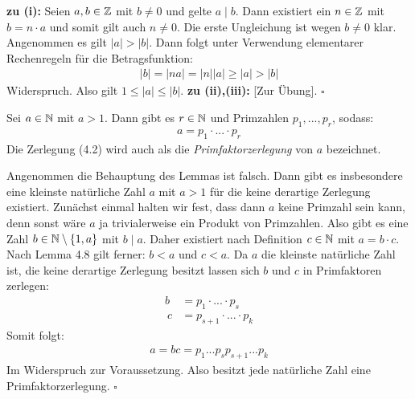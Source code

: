\begin{proof*}
    \textbf{zu (i):} \newline
    Seien $a,b \in \mathbb{Z}$ mit $b \neq 0$ und gelte $a \mid b$. Dann existiert ein $n \in \mathbb{Z}$ mit $b = n \cdot a$ und somit gilt auch $n \neq 0$. Die erste Ungleichung ist wegen $b \neq 0$ klar. Angenommen es gilt $\lvert a \rvert > \lvert b \rvert$. 
    Dann folgt unter Verwendung elementarer Rechenregeln für die Betragsfunktion: 
    \begin{align*}
        \lvert b \rvert = \lvert n a \rvert = \lvert n \rvert \lvert a \rvert \geq \lvert a \rvert > \lvert b \rvert
    \end{align*}
    Widerspruch. Also gilt $1 \leq \lvert a \rvert \leq \lvert b \rvert$.
    \newline 
    \textbf{zu (ii),(iii):} [Zur Übung]. \hfill $\square$
\end{proof*}

\begin{lemma}
    Sei $a \in \mathbb{N}$ mit $a > 1$. Dann gibt es $r \in \mathbb{N}$ und Primzahlen $p_1,...,p_r$, sodass: 
    \begin{align}
        a = p_1 \cdot ... \cdot p_r
    \end{align}
    Die Zerlegung (4.2) wird auch als die \textit{Primfaktorzerlegung} von $a$ bezeichnet. 
\end{lemma}

\begin{proof*}%
    Angenommen die Behauptung des Lemmas ist falsch. Dann gibt es insbesondere eine kleinste natürliche Zahl $a$ mit $a>1$ für die keine derartige Zerlegung existiert. 
    Zunächst einmal halten wir fest, dass dann $a$ keine Primzahl sein kann, denn sonst wäre $a$ ja trivialerweise ein Produkt von Primzahlen. 
    Also gibt es eine Zahl $b \in \mathbb{N} \setminus \{1,a\}$ mit $b \mid a$. Daher existiert nach Definition $c \in \mathbb{N}$ mit $a = b \cdot c$. Nach Lemma 4.8 gilt ferner: 
    $b < a$ und $c < a$. Da $a$ die kleinste natürliche Zahl ist, die keine derartige Zerlegung besitzt lassen sich $b$ und $c$ in Primfaktoren zerlegen: 
    \begin{align*}
        b &= p_1 \cdot ... \cdot p_s \\\
        c &= p_{s+1} \cdot ... \cdot p_k
    \end{align*}
    Somit folgt: 
    \begin{align*}
        a = b c = p_1 ... p_s p_{s+1} ... p_k 
    \end{align*}
    Im Widerspruch zur Voraussetzung. Also besitzt jede natürliche Zahl eine Primfaktorzerlegung. \hfill $\square$
\end{proof*}

